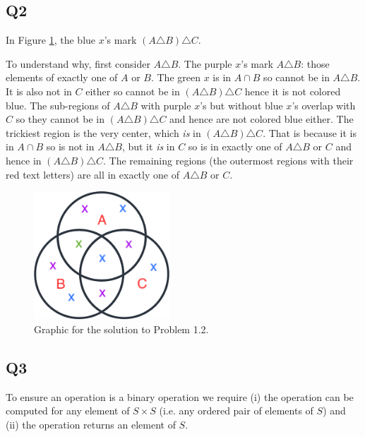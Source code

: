 \documentclass[12pt]{article}
\numberwithin{theorem}{section}
\numberwithin{equation}{section}
\numberwithin{remark}{section}
\numberwithin{definition}{section}
\numberwithin{theorem}{section}
\numberwithin{lemma}{section}
\numberwithin{example}{section}
\begin{document}
\subsection{Q2}

In Figure \ref{fig:problem_1.2_0}, the blue $x$'s mark $\left(A\triangle B\right)\triangle C$. 

To understand why, first consider $A\triangle B$. The purple $x$'s mark $A\triangle B$: those elements of exactly one of $A$ or $B$. The green $x$ is in $A\cap B$ so cannot be in $A\triangle B$. It is also not in $C$ either so cannot be in $\left(A\triangle B\right)\triangle C$ hence it is not colored blue. The sub-regions of $A\triangle B$ with purple $x$'s but without blue $x$'s overlap with $C$ so they cannot be in $\left(A\triangle B\right)\triangle C$ and hence are not colored blue either. The trickiest region is the very center, which \emph{is} in $\left(A\triangle B\right)\triangle C$. That is because it is in $A\cap B$ so is not in $A\triangle B$, but it \emph{is} in $C$ so is in exactly one of $A\triangle B$ or $C$ and hence in $\left(A\triangle B\right)\triangle C$. The remaining regions (the outermost regions with their red text letters) are all in exactly one of $A\triangle B$ or $C$. 

\begin{figure}
	\begin{center}
		\includegraphics[width=2in]{fig/problem_1.2.png}
		\caption{Graphic for the solution to Problem 1.2.}
		\label{fig:problem_1.2_0}
	\end{center}
\end{figure}



\subsection{Q3}

To ensure an operation is a binary operation we require (i) the operation can be computed for any element of $S\times S$ (i.e. any ordered pair of elements of $S$) and (ii) the operation returns an element of $S$. 
\end{document}
